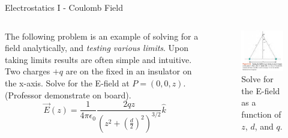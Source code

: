\documentclass{beamer}
\begin{document}
\begin{frame}{Electrostatics I - Coulomb Field}
\small
\begin{columns}[T]
\begin{column}{0.5\textwidth}
The following problem is an example of solving for a field analytically, and \textit{testing various limits}.  Upon taking limits results are often simple and intuitive. \\ \vspace{0.5cm}
Two charges $+q$ are on the fixed in an insulator on the x-axis.  Solve for the E-field at $P = (0,0,z)$. \\ \vspace{0.5cm}
(Professor demonstrate on board).
\begin{equation}
\vec{E}(z) = \frac{1}{4\pi\epsilon_0} \frac{2qz}{\left(z^2+\left(\frac{d}{2}\right)^2\right)^{3/2}} \hat{k}
\end{equation}
\end{column}
\begin{column}{0.5\textwidth}
\begin{figure}
\includegraphics[width=\textwidth]{figures/twoChargesZ.png}
\caption{\label{fig:twoChargesZ} Solve for the E-field as a function of $z$, $d$, and $q$.}
\end{figure}
\end{column}
\end{columns}
\end{frame}
\end{document}
